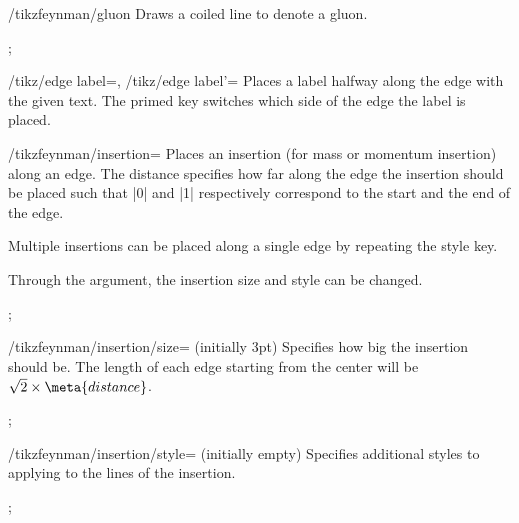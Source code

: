 \documentclass[a4paper,final]{ltxdoc}
\begin{document}
\begin{key}{/tikzfeynman/gluon}
  Draws a coiled line to denote a gluon.

\begin{codeexample}[]
;
\end{codeexample}
\end{key}

\begin{keylist}{%
  /tikz/edge label=,
  /tikz/edge label'=}
  Places a label halfway along the edge with the given text.  The primed key
  switches which side of the edge the label is placed.
\end{keylist}

\begin{key}{/tikzfeynman/insertion=}
  Places an insertion (for mass or momentum insertion) along an edge.  The
  distance specifies how far along the edge the insertion should be placed such
  that |0| and |1| respectively correspond to the start and the end of the edge.

  Multiple insertions can be placed along a single edge by repeating the style
  key.

  Through the  argument, the insertion size and style can be
  changed.

\begin{codeexample}[]
;
\end{codeexample}

  \begin{key}{/tikzfeynman/insertion/size= (initially 3pt)}
    Specifies how big the insertion should be.  The length of each edge starting
    from the center will be \(\sqrt{2} \times \meta{distance}\).

\begin{codeexample}[]
;
\end{codeexample}
  \end{key}

  \begin{key}{/tikzfeynman/insertion/style= (initially \normalfont empty)}
    Specifies additional styles to applying to the lines of the insertion.

\begin{codeexample}[]
;
\end{codeexample}
  \end{key}
\end{key}
\end{document}
